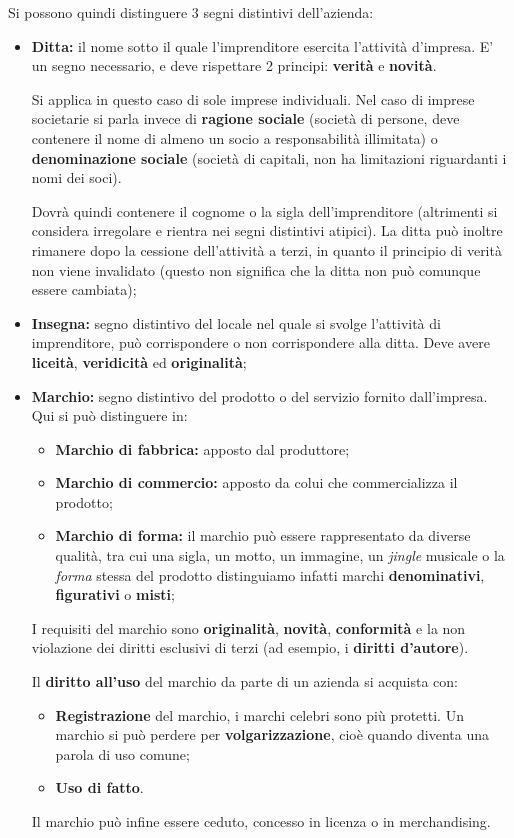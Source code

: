 \documentclass[a4paper,11pt]{article}
\begin{document}
Si possono quindi distinguere 3 segni distintivi dell'azienda:
\begin{itemize}
	\item \textbf{Ditta:} il nome sotto il quale l'imprenditore esercita l'attività d'impresa.
		E' un segno necessario, e deve rispettare 2 principi: \textbf{verità} e \textbf{novità}. 
		
		Si applica in questo caso di sole imprese individuali.
		Nel caso di imprese societarie si parla invece di \textbf{ragione sociale} (società di persone, deve contenere il nome di almeno un socio a responsabilità illimitata) o \textbf{denominazione sociale} (società di capitali, non ha limitazioni riguardanti i nomi dei soci).

		Dovrà quindi contenere il cognome o la sigla dell'imprenditore (altrimenti si considera irregolare e rientra nei segni distintivi atipici).
		La ditta può inoltre rimanere dopo la cessione dell'attività a terzi, in quanto il principio di verità non viene invalidato (questo non significa che la ditta non può comunque essere cambiata);

	\item \textbf{Insegna:} segno distintivo del locale nel quale si svolge l'attività di imprenditore, può corrispondere o non corrispondere alla ditta. Deve avere \textbf{liceità}, \textbf{veridicità} ed \textbf{originalità};

	\item \textbf{Marchio:} segno distintivo del prodotto o del servizio fornito dall'impresa. Qui si può distinguere in:
		\begin{itemize}
			\item \textbf{Marchio di fabbrica:} apposto dal produttore;
			\item \textbf{Marchio di commercio:} apposto da colui che commercializza il prodotto;
			\item \textbf{Marchio di forma:} il marchio può essere rappresentato da diverse qualità, tra cui una sigla, un motto, un immagine, un \textit{jingle} musicale o la \textit{forma} stessa del prodotto distinguiamo infatti marchi \textbf{denominativi}, \textbf{figurativi} o \textbf{misti};
		\end{itemize}
		I requisiti del marchio sono \textbf{originalità}, \textbf{novità}, \textbf{conformità} e la non violazione dei diritti esclusivi di terzi (ad esempio, i \textbf{diritti d'autore}).

		Il \textbf{diritto all'uso} del marchio da parte di un azienda si acquista con:
		\begin{itemize}
			\item \textbf{Registrazione} del marchio, i marchi celebri sono più protetti. Un marchio si può perdere per \textbf{volgarizzazione}, cioè quando diventa una parola di uso comune;
			\item \textbf{Uso di fatto}. 
		\end{itemize}

		Il marchio può infine essere ceduto, concesso in licenza o in merchandising.
		
\end{itemize}
\end{document}
